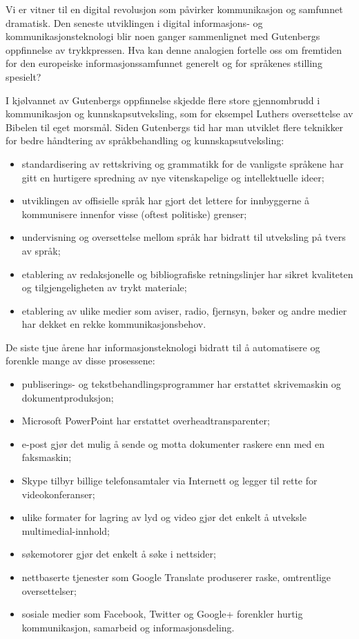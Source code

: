 \begin{multicols}{2}
Vi er vitner til en digital revolusjon som påvirker kommunikasjon og samfunnet dramatisk. Den seneste utviklingen i digital informasjons- og kommunikasjonsteknologi blir noen ganger sammenlignet med Gutenbergs oppfinnelse av trykkpressen. Hva kan denne analogien fortelle oss om fremtiden for den europeiske informasjonssamfunnet generelt og for språkenes stilling spesielt?


I kjølvannet av Gutenbergs oppfinnelse skjedde flere store gjennombrudd i kommunikasjon og kunnskapsutveksling, som for eksempel Luthers oversettelse av Bibelen til eget morsmål. Siden Gutenbergs tid har man utviklet flere teknikker for bedre håndtering av språkbehandling og kunnskapsutveksling:

\begin{itemize}
\item standardisering av rettskriving og grammatikk for de vanligste språkene har gitt en hurtigere  spredning av nye vitenskapelige og intellektuelle ideer;
\item utviklingen av offisielle språk har gjort det lettere for innbyggerne å kommunisere innenfor visse (oftest politiske) grenser;
\item undervisning og oversettelse mellom språk har bidratt til utveksling på tvers av språk;
\item etablering av redaksjonelle og bibliografiske retningslinjer har sikret kvaliteten og tilgjengeligheten av trykt materiale;
\item etablering av ulike medier som aviser, radio, fjernsyn, bøker og andre medier har dekket en rekke kommunikasjonsbehov.
\end{itemize}

De siste tjue årene har informasjonsteknologi bidratt til å automatisere og forenkle mange av disse prosessene:

\begin{itemize}
\item publiserings- og tekstbehandlingsprogrammer har erstattet skrivemaskin og dokumentproduksjon;
\item Microsoft PowerPoint har erstattet overheadtransparenter;
\item e-post gjør det mulig å sende og motta dokumenter raskere enn med en faksmaskin;
\item Skype tilbyr billige telefonsamtaler via Internett og legger til rette for videokonferanser;
\item ulike formater for lagring av lyd og video gjør det enkelt å utveksle multimedial-innhold;
\item søkemotorer gjør det enkelt å søke i nettsider;
\item nettbaserte tjenester som Google Translate produserer raske, omtrentlige oversettelser;
\item sosiale medier som Facebook, Twitter og Google+ forenkler hurtig kommunikasjon, samarbeid og informasjonsdeling.
\end{itemize}


\end{multicols}
